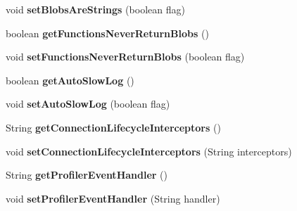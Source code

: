 \begin{DoxyCompactItemize}
void {\bfseries set\+Blobs\+Are\+Strings} (boolean flag)
\item 
\mbox{\label{interfacecom_1_1mysql_1_1jdbc_1_1_connection_properties_a70ac540b1bdab6368a4e450882d01031}} 
boolean {\bfseries get\+Functions\+Never\+Return\+Blobs} ()
\item 
\mbox{\label{interfacecom_1_1mysql_1_1jdbc_1_1_connection_properties_ad9d0d25fdb1caf266910393b9610117d}} 
void {\bfseries set\+Functions\+Never\+Return\+Blobs} (boolean flag)
\item 
\mbox{\label{interfacecom_1_1mysql_1_1jdbc_1_1_connection_properties_a5f4774fc832aa1664b23182e3e3883da}} 
boolean {\bfseries get\+Auto\+Slow\+Log} ()
\item 
\mbox{\label{interfacecom_1_1mysql_1_1jdbc_1_1_connection_properties_a5429072fa490e0748e0ebf2a5b2a2d50}} 
void {\bfseries set\+Auto\+Slow\+Log} (boolean flag)
\item 
\mbox{\label{interfacecom_1_1mysql_1_1jdbc_1_1_connection_properties_a76abe05b790281b41d71f897bacd7085}} 
String {\bfseries get\+Connection\+Lifecycle\+Interceptors} ()
\item 
\mbox{\label{interfacecom_1_1mysql_1_1jdbc_1_1_connection_properties_ac8a9bfb4229bc4104da2298fd74a6cc0}} 
void {\bfseries set\+Connection\+Lifecycle\+Interceptors} (String interceptors)
\item 
\mbox{\label{interfacecom_1_1mysql_1_1jdbc_1_1_connection_properties_a594b1f86bea0067b798bee2ee9362e3a}} 
String {\bfseries get\+Profiler\+Event\+Handler} ()
\item 
\mbox{\label{interfacecom_1_1mysql_1_1jdbc_1_1_connection_properties_ad295e3cb384de81b4dc0aa1a6e2c84a8}} 
void {\bfseries set\+Profiler\+Event\+Handler} (String handler)
\item 

\end{DoxyCompactItemize}
